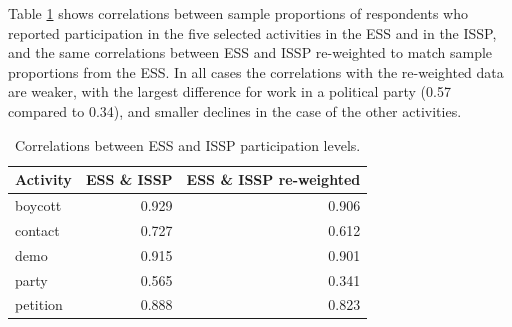 \documentclass[12pt,]{article}
\begin{document}
Table \ref{tab:sample-re-weighting} shows correlations between sample proportions of respondents who reported participation in the five selected activities in the ESS and in the ISSP, and the same correlations between ESS and ISSP re-weighted to match sample proportions from the ESS. In all cases the correlations with the re-weighted data are weaker, with the largest difference for work in a political party (0.57 compared to 0.34), and smaller declines in the case of the other activities.

\begin{table}[t]

\caption{\label{tab:sample-re-weighting}Correlations between ESS and ISSP participation levels.}
\centering
\fontsize{11}{13}\selectfont
\begin{tabular}{lrr}
\toprule
Activity & ESS \& ISSP & ESS \& ISSP re-weighted\\
\midrule
\rowcolor{gray!6}  boycott & 0.929 & 0.906\\
contact & 0.727 & 0.612\\
\rowcolor{gray!6}  demo & 0.915 & 0.901\\
party & 0.565 & 0.341\\
\rowcolor{gray!6}  petition & 0.888 & 0.823\\
\bottomrule
\end{tabular}
\end{table}
\end{document}
